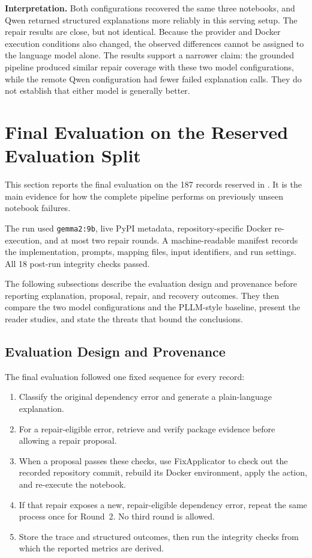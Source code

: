 \textbf{Interpretation.} Both configurations recovered the same three
notebooks, and Qwen returned structured explanations more reliably in this
serving setup. The repair results are close, but not identical. Because the
provider and Docker execution conditions also changed, the observed differences
cannot be assigned to the language model alone. The results support a narrower
claim: the grounded pipeline produced similar repair coverage with these two
model configurations, while the remote Qwen configuration had fewer failed
explanation calls. They do not establish that either model is generally better.

\fi

\section{Final Evaluation on the Reserved Evaluation Split}
\label{sec:v-final-eval-current}
\label{sec:v-final-eval}

This section reports the final evaluation on the 187 records reserved in
. It is the main evidence for how the complete
pipeline performs on previously unseen notebook failures.

The run used \texttt{gemma2:9b}, live PyPI metadata, repository-specific
Docker re-execution, and at most two repair rounds. A machine-readable
manifest records the implementation, prompts, mapping files, input identifiers,
and run settings. All 18 post-run integrity checks passed.

The following subsections describe the evaluation design and provenance before
reporting explanation, proposal, repair, and recovery outcomes. They then
compare the two model configurations and the PLLM-style baseline, present the
reader studies, and state the threats that bound the conclusions.

\subsection{Evaluation Design and Provenance}
\label{sec:v-final-design}

The final evaluation followed one fixed sequence for every record:

\begin{enumerate}
  \item Classify the original dependency error and generate a plain-language
        explanation.
  \item For a repair-eligible error, retrieve and verify package evidence before
        allowing a repair proposal.
  \item When a proposal passes these checks, use FixApplicator to check out the
        recorded repository commit, rebuild its Docker environment, apply the
        action, and re-execute the notebook.
  \item If that repair exposes a new, repair-eligible dependency error, repeat
        the same process once for Round~2. No third round is allowed.
  \item Store the trace and structured outcomes, then run the integrity checks
        from which the reported metrics are derived.
\end{enumerate}

